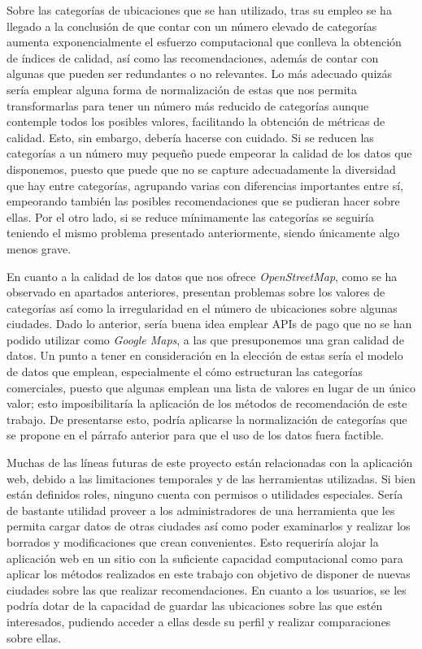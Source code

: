 Sobre las categorías de ubicaciones que se han utilizado, tras su empleo se ha llegado a la conclusión de que contar con un número elevado de categorías aumenta exponencialmente el esfuerzo computacional que conlleva la obtención de índices de calidad, así como las recomendaciones, además de contar con algunas que pueden ser redundantes o no relevantes. Lo más adecuado quizás sería emplear alguna forma de normalización de estas que nos permita transformarlas para tener un número más reducido de categorías aunque contemple todos los posibles valores, facilitando la obtención de métricas de calidad. Esto, sin embargo, debería hacerse con cuidado. Si se reducen las categorías a un número muy pequeño puede empeorar la calidad de los datos que disponemos, puesto que puede que no se capture adecuadamente la diversidad que hay entre categorías, agrupando varias con diferencias importantes entre sí, empeorando también las posibles recomendaciones que se pudieran hacer sobre ellas. Por el otro lado, si se reduce mínimamente las categorías se seguiría teniendo el mismo problema presentado anteriormente, siendo únicamente algo menos grave.

En cuanto a la calidad de los datos que nos ofrece \textit{OpenStreetMap}, como se ha observado en apartados anteriores, presentan problemas sobre los valores de categorías así como la irregularidad en el número de ubicaciones sobre algunas ciudades. Dado lo anterior, sería buena idea emplear APIs de pago que no se han podido utilizar como \textit{Google Maps}, a las que presuponemos una gran calidad de datos. Un punto a tener en consideración en la elección de estas sería el modelo de datos que emplean, especialmente el cómo estructuran las categorías comerciales, puesto que algunas emplean una lista de valores en lugar de un único valor; esto imposibilitaría la aplicación de los métodos de recomendación de este trabajo. De presentarse esto, podría aplicarse la normalización de categorías que se propone en el párrafo anterior para que el uso de los datos fuera factible.

Muchas de las líneas futuras de este proyecto están relacionadas con la aplicación web, debido a las limitaciones temporales y de las herramientas utilizadas. Si bien están definidos roles, ninguno cuenta con permisos o utilidades especiales. Sería de bastante utilidad proveer a los administradores de una herramienta que les permita cargar datos de otras ciudades así como poder examinarlos y realizar los borrados y modificaciones que crean convenientes. Esto requeriría alojar la aplicación web en un sitio con la suficiente capacidad computacional como para aplicar los métodos realizados en este trabajo con objetivo de disponer de nuevas ciudades sobre las que realizar recomendaciones. En cuanto a los usuarios, se les podría dotar de la capacidad de guardar las ubicaciones sobre las que estén interesados, pudiendo acceder a ellas desde su perfil y realizar comparaciones sobre ellas.

